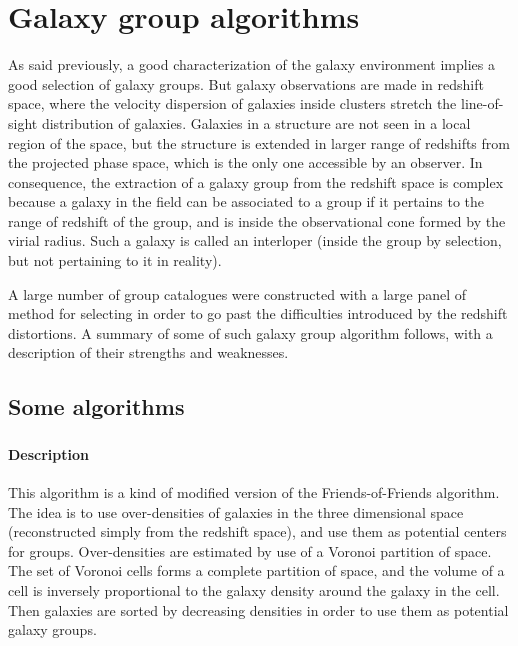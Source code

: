 \chapter{Galaxy group algorithms}
\label{cha:galaxy_group_algorithms}

As said previously, a good characterization of the galaxy environment implies a
good selection of galaxy groups. But galaxy observations are made in redshift
space, where the velocity dispersion of galaxies inside clusters stretch the
line-of-sight distribution of galaxies. Galaxies in a structure are not seen in
a local region of the space, but the structure is extended in larger range of
redshifts from the projected phase space, which is the only one accessible by
an observer.
In consequence, the extraction of a galaxy group from the redshift space is
complex because a galaxy in the field can be associated to a group if it
pertains to the range of redshift of the group, and is inside the observational
cone formed by the virial radius. Such a galaxy is called an interloper (inside
the group by selection, but not pertaining to it in reality).

A large number of group catalogues were constructed with a large panel of
method for selecting in order to go past the difficulties introduced by the
redshift distortions. A summary of some of such galaxy group algorithm follows,
with a description of their strengths and weaknesses.

\section{Some algorithms}
\label{sec:some_algorithms}

\subsection{\citet{Marinoni+02}}
\label{sub:marinoni02}

\subsubsection{Description}
\label{ssub:description}

This algorithm is a kind of modified version of the Friends-of-Friends
algorithm. The idea is to use over-densities of galaxies in the three
dimensional space (reconstructed simply from the redshift space), and use them
as potential centers for groups. Over-densities are estimated by use of a
Voronoi partition of space. The set of Voronoi cells forms a complete partition
of space, and the volume of a cell is inversely proportional to the galaxy
density around the galaxy in the cell. Then galaxies are sorted by decreasing
densities in order to use them as potential galaxy groups.

